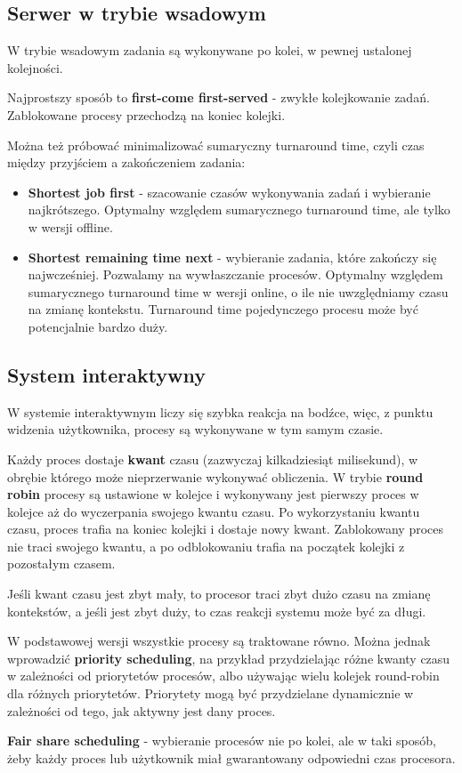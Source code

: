 \subsection{Serwer w trybie wsadowym}

W trybie wsadowym zadania są wykonywane po kolei, w pewnej ustalonej kolejności.

Najprostszy sposób to \textbf{first-come first-served} - zwykłe kolejkowanie zadań. Zablokowane procesy przechodzą na koniec kolejki.

Można też próbować minimalizować sumaryczny turnaround time, czyli czas między przyjściem a zakończeniem zadania:
\begin{itemize}
    \item \textbf{Shortest job first} - szacowanie czasów wykonywania zadań i wybieranie najkrótszego. Optymalny względem sumarycznego turnaround time, ale tylko w wersji offline.
    \item \textbf{Shortest remaining time next} - wybieranie zadania, które zakończy się najwcześniej. Pozwalamy na wywłaszczanie procesów. Optymalny względem sumarycznego turnaround time w wersji online, o ile nie uwzględniamy czasu na zmianę kontekstu. Turnaround time pojedynczego procesu może być potencjalnie bardzo duży.
\end{itemize}

\subsection{System interaktywny}

W systemie interaktywnym liczy się szybka reakcja na bodźce, więc, z punktu widzenia użytkownika, procesy są wykonywane w tym samym czasie.

Każdy proces dostaje \textbf{kwant} czasu (zazwyczaj kilkadziesiąt milisekund), w obrębie którego może nieprzerwanie wykonywać obliczenia. W trybie \textbf{round robin} procesy są ustawione w kolejce i wykonywany jest pierwszy proces w kolejce aż do wyczerpania swojego kwantu czasu. Po wykorzystaniu kwantu czasu, proces trafia na koniec kolejki i dostaje nowy kwant. Zablokowany proces nie traci swojego kwantu, a po odblokowaniu trafia na początek kolejki z pozostałym czasem.

Jeśli kwant czasu jest zbyt mały, to procesor traci zbyt dużo czasu na zmianę kontekstów, a jeśli jest zbyt duży, to czas reakcji systemu może być za długi.

W podstawowej wersji wszystkie procesy są traktowane równo. Można jednak wprowadzić \textbf{priority scheduling}, na przykład przydzielając różne kwanty czasu w zależności od priorytetów procesów, albo używając wielu kolejek round-robin dla różnych priorytetów. Priorytety mogą być przydzielane dynamicznie w zależności od tego, jak aktywny jest dany proces.

\textbf{Fair share scheduling} - wybieranie procesów nie po kolei, ale w taki sposób, żeby każdy proces lub użytkownik miał gwarantowany odpowiedni czas procesora.